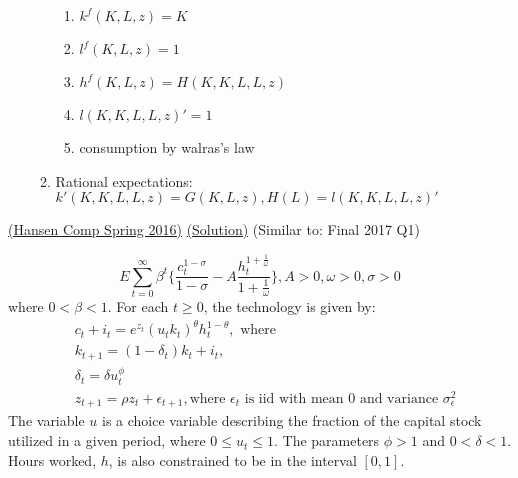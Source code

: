 \documentclass[answers]{exam}
\begin{document}
\begin{questions}
\begin{solution}
\begin{enumerate}
\begin{enumerate}
\begin{enumerate}
                \item $k^f(K,L,z) = K$
                \item $l^f(K,L,z) = 1$
                \item $h^f(K,L,z) = H(K,K,L,L,z)$
                \item $l(K,K,L,L,z)' = 1$
                \item consumption by walras's law
            \end{enumerate}
            \item Rational expectations: $k'(K,K,L,L,z) = G(K,L,z), H(L) = l(K,K,L,L,z)'$
        \end{enumerate}
    \end{enumerate}
\end{solution}

    \question \href{https://economics.ucla.edu/wp-content/uploads/2016/10/macro-f16.pdf}{(Hansen Comp Spring 2016)}
    \href{https://drive.google.com/file/u/3/d/1I_XVSpJZWsAtp4uIZizpPaIZk6EHggCC/view?usp=drive_open}{(Solution)}
    (Similar to: Final 2017 Q1)

    $$E \sum_{t=0}^{\infty} \beta^t \{\frac{c_t^{1-\sigma}}{1-\sigma} - A \frac{h_t^{1+\frac{1}{\omega}}}{1+ \frac{1}{\omega}}\}, A> 0, \omega > 0, \sigma > 0$$
    where $0 < \beta < 1$. For each $t \geq 0$, the technology is given by:
    \begin{align*}
        &c_t + i_t = e^{z_t} (u_t k_t)^{\theta} h_t^{1-\theta}, \text{ where}\\
        &k_{t+1} = (1-\delta_t) k_t + i_t,\\
        &\delta_t = \delta u_t^\phi\\
        &z_{t+1} = \rho z_t + \epsilon_{t+1}, \text{where $\epsilon_{t}$ is iid with mean 0 and variance $\sigma_{\epsilon}^2$}
    \end{align*}
    The variable $u$ is a choice variable describing the fraction of the capital stock utilized in a given period, where $0 \leq u_t \leq 1$. The parameters $\phi > 1$ and $0 < \delta < 1$. Hours worked, $h$, is also constrained to be in the interval $[0,1]$.
    \begin{parts}

\end{parts}
\end{questions}
\end{document}
